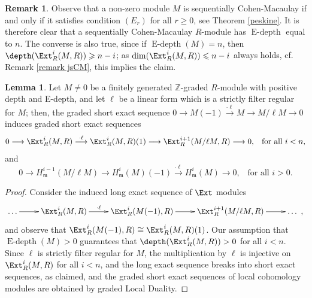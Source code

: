 \documentclass[12pt]{amsart}
\theoremstyle{definition}
\newtheorem{lemma}[theorem]{Lemma}
\theoremstyle{definition}
\newtheorem{remark}[theorem]{Remark}
\newcommand{\m}{\mathfrak{m}}
\def\NZQ{\mathbb}               %
\def\ZZ{{\NZQ Z}}
\renewcommand{\leq}{\leqslant}
\renewcommand{\geq}{\geqslant}
\let\lra\longrightarrow
\DeclareMathOperator{\Edepth}{E-depth}
\begin{document}
\begin{remark} \label{Remark E-depth}
Observe that a non-zero module $M$ is sequentially Cohen-Macaulay if and only if it satisfies condition $(E_r)$ for all $r \geq 0$, see Theorem \ref{peskine}. It is therefore clear that a sequentially Cohen-Macaulay $R$-module has $\Edepth$ equal to $n$. The converse is also true, since if $\Edepth(M)=n$, then $\depth(\Ext^i_R(M,R)) \geq n-i$; as $\dim(\Ext^i_R(M,R)) \leq n-i$ always holds, cf. Remark \ref{remark jsCM}, this implies the claim.
\end{remark}


\begin{lemma} \label{lemma ses Edepth} Let $M \ne 0$ be a finitely generated $\ZZ$-graded $R$-module with positive depth and E-depth, and let $\ell$ be a linear form which is a strictly filter regular for $M$; then, the graded short exact sequence $0 \lra M(-1) \stackrel{\cdot \ell}{\lra} M \lra M/\ell M \lra 0$ induces graded short exact sequences 
\[
0 \lra  \Ext^i_R(M,R) \stackrel{\cdot \ell}{\lra}   \Ext^i_R(M,R)(1) \lra \Ext^{i+1}_R(M/\ell M,R) \lra 0,\,\,\, \text{ for all } i<n,
\]
and 
\[
0 \lra H^{i-1}_\m(M/\ell M) \lra  H^i_\m(M)(-1) \stackrel{\cdot \ell}{\lra}  H^i_\m(M) \lra 0,\,\,\, \text{ for all } i>0.
\]
\end{lemma}
\begin{proof}
Consider the induced long exact sequence of $\Ext$ modules
\[
\xymatrix{
\ldots \ar[r] & \Ext^i_R(M,R) \ar[r]^-{\cdot \ell} & \Ext^i_R(M(-1),R) \ar[r] & \Ext^{i+1}_R(M/\ell M,R) \ar[r] & \ldots \,\,,
}
\]
and observe that $\Ext^i_R(M(-1),R) \cong \Ext^i_R(M,R)(1)$. Our assumption that $\Edepth(M)>0$ guarantees that $\depth(\Ext^i_R(M,R))>0$ for all $i<n$. Since $\ell$ is  strictly filter regular  for $M$, the multiplication by $\ell$ is injective on $\Ext^i_R(M,R)$ for all $i<n$, and the long exact sequence breaks into short exact sequences, as claimed, and the graded short exact sequences of local cohomology modules are obtained by graded Local Duality. 
\end{proof}
\end{document}
